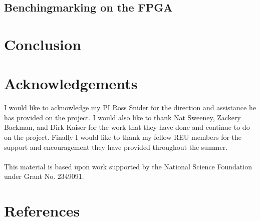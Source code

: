 \documentclass{article}
\begin{document}
\subsection{Benchingmarking on the FPGA}

\section{Conclusion}


\section{Acknowledgements}
I would like to acknowledge my PI Ross Snider for the direction and assistance he has provided on the project. I would also like to thank Nat Sweeney, Zackery Backman, and Dirk Kaiser for the work that they have done and continue to do on the project. Finally I would like to thank my fellow REU members for the support and encouragement they have provided throughout the summer.\\\\
This material is based upon work supported by the National Science Foundation under Grant No. 2349091.

\section{References}
\nocite{*}


\end{document}
